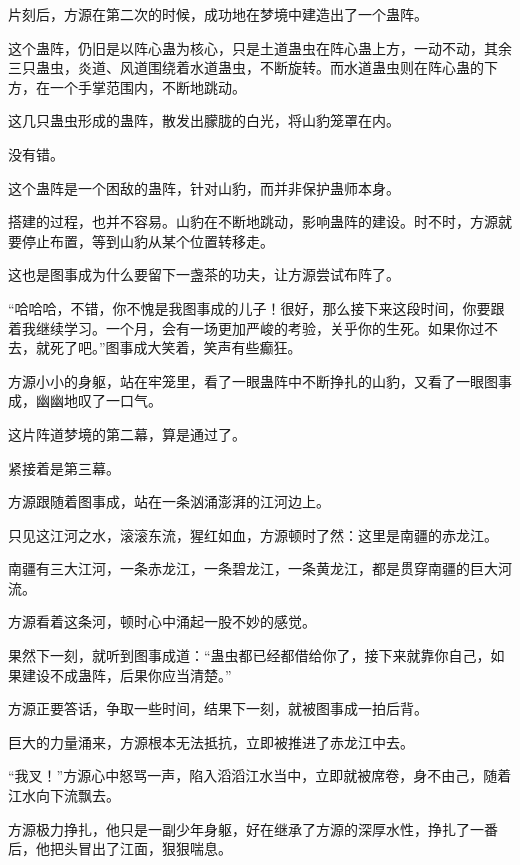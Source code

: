 
\begin{this_body}

片刻后，方源在第二次的时候，成功地在梦境中建造出了一个蛊阵。

这个蛊阵，仍旧是以阵心蛊为核心，只是土道蛊虫在阵心蛊上方，一动不动，其余三只蛊虫，炎道、风道围绕着水道蛊虫，不断旋转。而水道蛊虫则在阵心蛊的下方，在一个手掌范围内，不断地跳动。

这几只蛊虫形成的蛊阵，散发出朦胧的白光，将山豹笼罩在内。

没有错。

这个蛊阵是一个困敌的蛊阵，针对山豹，而并非保护蛊师本身。

搭建的过程，也并不容易。山豹在不断地跳动，影响蛊阵的建设。时不时，方源就要停止布置，等到山豹从某个位置转移走。

这也是图事成为什么要留下一盏茶的功夫，让方源尝试布阵了。

“哈哈哈，不错，你不愧是我图事成的儿子！很好，那么接下来这段时间，你要跟着我继续学习。一个月，会有一场更加严峻的考验，关乎你的生死。如果你过不去，就死了吧。”图事成大笑着，笑声有些癫狂。

方源小小的身躯，站在牢笼里，看了一眼蛊阵中不断挣扎的山豹，又看了一眼图事成，幽幽地叹了一口气。

这片阵道梦境的第二幕，算是通过了。

紧接着是第三幕。

方源跟随着图事成，站在一条汹涌澎湃的江河边上。

只见这江河之水，滚滚东流，猩红如血，方源顿时了然：这里是南疆的赤龙江。

南疆有三大江河，一条赤龙江，一条碧龙江，一条黄龙江，都是贯穿南疆的巨大河流。

方源看着这条河，顿时心中涌起一股不妙的感觉。

果然下一刻，就听到图事成道：“蛊虫都已经都借给你了，接下来就靠你自己，如果建设不成蛊阵，后果你应当清楚。”

方源正要答话，争取一些时间，结果下一刻，就被图事成一拍后背。

巨大的力量涌来，方源根本无法抵抗，立即被推进了赤龙江中去。

“我叉！”方源心中怒骂一声，陷入滔滔江水当中，立即就被席卷，身不由己，随着江水向下流飘去。

方源极力挣扎，他只是一副少年身躯，好在继承了方源的深厚水性，挣扎了一番后，他把头冒出了江面，狠狠喘息。


\end{this_body}
